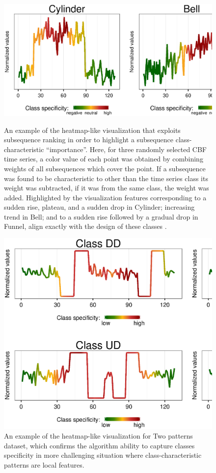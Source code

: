 \begin{figure}[t]
   \centering
   \includegraphics[width=140mm]{figures/cbf-heatmap.ps}
   \caption{An example of the heatmap-like visualization that exploits subsequence ranking in order to highlight a 
   subsequence class-characteristic ``importance''.
   Here, for three randomly selected CBF time series, a color value of each point was obtained by combining 
   \tfidf weights of all subsequences which cover the point.
   If a subsequence was found to be characteristic to other than the time series class its weight was subtracted, 
   if it was from the same class, the weight was added. Highlighted by the visualization features corresponding to a 
   sudden rise, plateau, and a sudden drop in Cylinder; increasing trend in Bell;
   and to a sudden rise followed by a gradual drop in Funnel, align exactly with the
   design of these classes \cite{citeulike:12563781}.}
   \label{fig:heat}
   \vspace{1cm}
   \includegraphics[width=140mm]{figures/2patterns-heatmap.ps}
   \caption{An example of the heatmap-like visualization for Two patterns dataset, which confirms the algorithm ability 
   to capture classes specificity in more challenging situation where class-characteristic patterns are local features.}
\end{figure}

